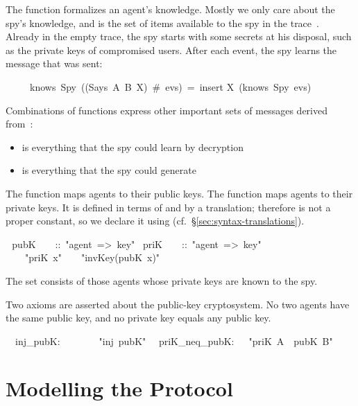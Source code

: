 The function  formalizes an agent's knowledge.  Mostly we only
care about the spy's knowledge, and  is the set of items
available to the spy in the trace~.  Already in the empty trace,
the spy starts with some secrets at his disposal, such as the private keys
of compromised users.  After each  event, the spy learns the
message that was sent:
\begin{isabelle}
\ \ \ \ \ knows\ Spy\ ((Says\ A\ B\ X)\ \#\ evs)\ =\ insert X\ (knows\ Spy\ evs)
\end{isabelle}
%
Combinations of functions express other important
sets of messages derived from~:
\begin{itemize}
\item {} is everything that the spy could
learn by decryption
\item {} is everything that the spy
could generate
\end{itemize}

The function
 maps agents to their public keys.  The function
 maps agents to their private keys.  It is defined in terms of
 and  by a translation; therefore  is
not a proper constant, so we declare it using 
(cf.\ \S\ref{sec:syntax-translations}).
\begin{isabelle}
\ \,pubK\ \ \ \ ::\ "agent\ =>\ key"\isanewline
{}\ priK\ \ \ \ ::\ "agent\ =>\ key"\isanewline
{}\ \ \ \ "priK\ x"\ \ \isasymrightleftharpoons\ \ "invKey(pubK\ x)"
\end{isabelle}
The set  consists of those agents whose private keys are known to
the spy.

Two axioms are asserted about the public-key cryptosystem. 
No two agents have the same public key, and no private key equals
any public key.
\begin{isabelle}
\isanewline
\ \ inj_pubK:\ \ \ \ \ \ \ \ "inj\ pubK"\isanewline
\ \ priK_neq_pubK:\ \ \ "priK\ A\ \isasymnoteq\ pubK\ B"
\end{isabelle}





\section{Modelling the Protocol}\label{sec:modelling}

